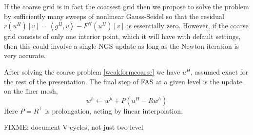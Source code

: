 \documentclass[letterpaper,final,12pt,reqno]{amsart}
\newcommand{\ip}[2]{\left<#1,#2\right>}
\begin{document}
If the coarse grid is in fact the coarsest grid then we propose to solve the problem by sufficiently many sweeps of nonlinear Gauss-Seidel so that the residual $r(u^H)[v] = \ip{g^H}{v} - F^H(u^H)[v]$ is essentially zero.  However, if the coarse grid consists of only one interior point, which it will have with default settings, then this could involve a single NGS update as long as the Newton iteration is very accurate.

After solving the coarse problem \eqref{weakformcoarse} we have $u^H$, assumed exact for the rest of the presentation.  The final step of FAS at a given level is the update on the finer mesh,
\begin{equation}
  w^h \longleftarrow w^h + P(u^H - R w^h) \label{fasupdate}
\end{equation}
Here $P=R^\top$ is prolongation, acting by linear interpolation.

FIXME: document V-cycles, not just two-level

\small

\bigskip


\end{document}
